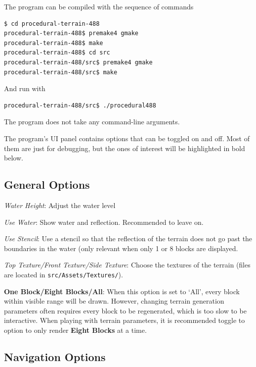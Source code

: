 \documentclass {article}
\begin{document}
The program can be compiled with the sequence of commands

\begin{lstlisting}
$ cd procedural-terrain-488
procedural-terrain-488$ premake4 gmake
procedural-terrain-488$ make
procedural-terrain-488$ cd src
procedural-terrain-488/src$ premake4 gmake
procedural-terrain-488/src$ make
\end{lstlisting}

And run with

\begin{lstlisting}
procedural-terrain-488/src$ ./procedural488
\end{lstlisting}

The program does not take any command-line arguments.

The program's UI panel contains options that can be toggled on and off. Most of them are just for debugging, but the ones of interest will be highlighted in bold below.

\subsection{General Options}


\textit{Water Height}: Adjust the water level

\textit{Use Water}: Show water and reflection. Recommended to leave on.

\textit{Use Stencil}: Use a stencil so that the reflection of the terrain does not go past the boundaries in the water (only relevant when only 1 or 8 blocks are displayed.

\textit{Top Texture/Front Texture/Side Texture}: Choose the textures of the terrain (files are located in \texttt{src/Assets/Textures/}).

\textbf{One Block/Eight Blocks/All}: When this option is set to `All', every block within visible range will be drawn. However, changing terrain generation parameters often requires every block to be regenerated, which is too slow to be interactive. When playing with terrain parameters, it is recommended toggle to option to only render \textbf{Eight Blocks} at a time.

\subsection{Navigation Options}
\end{document}
